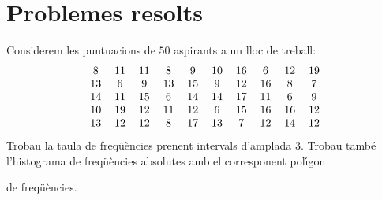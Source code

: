 \section{Problemes resolts}

\begin{probres}
{
Considerem les puntuacions de $50$ aspirants a un lloc 
de treball:
$$\begin{tabular}{cccccccccc}
8 & 11 & 11 & 8 & 9 & 10 & 16 & 6 & 12 & 19 \\
13 & 6 & 9 & 13 & 15 & 9 & 12 & 16 & 8 & 7 \\
14 & 11 & 15 & 6 & 14 & 14 & 17 & 11 & 6 & 9 \\
10 & 19 & 12 & 11 & 12 &  6 & 15 & 16 & 16 & 12 \\ 
13 & 12 & 12 & 8 & 17 & 13 & 7 & 12 & 14 & 12 
\end{tabular}
$$
Trobau la taula 
de freq\"u\`encies prenent intervals 
d'amplada $3$.  Trobau tamb\'e l'histograma 
de freq\"u\`encies absolutes amb el 
corresponent pol\'{\i}gon
 
de freq\"u\`encies.
}
\end{probres}
\newpage

